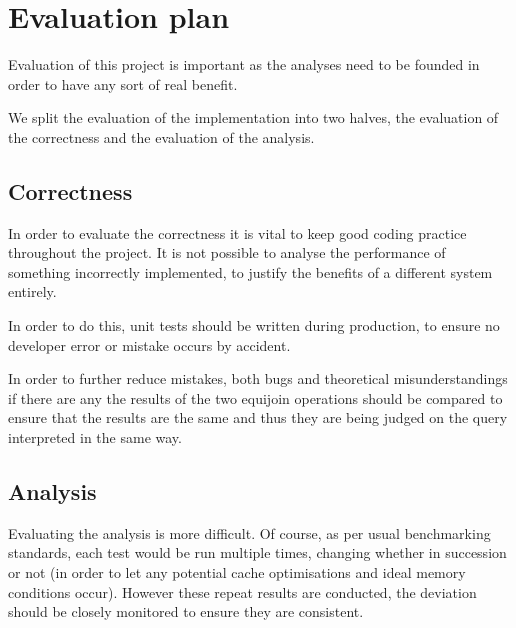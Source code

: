 \chapter{Evaluation plan} %
\begin{comment}
Project evaluation is very important, so it's important to think now about how you plan to measure success. For example, what functionality do you need to demonstrate?  What experiments to you need to undertake and what outcome(s) would constitute success?  What benchmarks should you use? How has your project extended the state of the art?  How do you measure qualitative aspects, such as ease of use?  These are the sort of questions that your project evaluation should address; this section should outline your plan.
\end{comment}
Evaluation of this project is important as the analyses need to be founded in order to have any sort of real benefit.

We split the evaluation of the implementation into two halves, the evaluation of the correctness and the evaluation of the analysis.

\section{Correctness}\label{sec:correctnessevaluation}
In order to evaluate the correctness it is vital to keep good coding practice throughout the project. It is not possible to analyse the performance of something incorrectly implemented, to justify the benefits of a different system entirely.

In order to do this, unit tests should be written during production, to ensure no developer error or mistake occurs by accident.

In order to further reduce mistakes, both bugs and theoretical misunderstandings if there are any the results of the two equijoin operations should be compared to ensure that the results are the same and thus they are being judged on the query interpreted in the same way.

\section{Analysis}
Evaluating the analysis is more difficult. Of course, as per usual benchmarking standards, each test would be run multiple times, changing whether in succession or not (in order to let any potential cache optimisations and ideal memory conditions occur). However these repeat results are conducted, the deviation should be closely monitored to ensure they are consistent.

